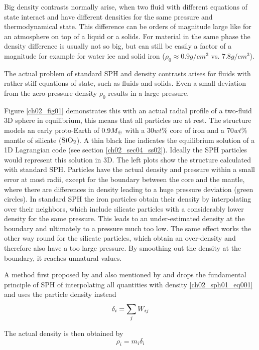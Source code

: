 Big density contrasts normally arise, when two fluid with different equations of state interact and have different densities for the same pressure and thermodynamical state. This difference can be orders of magnitude large like for an atmosphere on top of a liquid or a solids. For material in the same phase the density difference is usually not so big, but can still be easily a factor of a magnitude for example for water ice and solid iron ($\rho_0 \approx 0.9 g/cm^3$ vs. $7.8 g/cm^3$).

The actual problem of standard SPH and density contrasts arises for fluids with rather stiff equations of state, such as fluids and solids. Even a small deviation from the zero-pressure density $\rho_0$  results in a large pressure. 

Figure \ref{ch02_fig01} demonstrates this with an actual radial profile of a two-fluid 3D sphere in equilibrium, this means that all particles are at rest. The structure models an early proto-Earth of $0.9 M_{\oplus}$ with a $30 wt\%$ core of iron and a $70 wt\%$ mantle of silicate ($\mathrm{SiO}_2$). A thin black line indicates the equilibrium solution of a 1D Lagrangian code (see section \ref{ch02_sec04_ss02}). Ideally the SPH particles would represent this solution in 3D. The left plots show the structure calculated with standard SPH. Particles have the actual density and pressure within a small error at most radii, except for the boundary between the core and the mantle, where there are differences in density leading to a huge pressure deviation (green circles). In standard SPH the iron particles obtain their density by interpolating over their neighbors, which include silicate particles with a considerably lower density for the same pressure. This leads to an under-estimated density at the boundary and ultimately to a pressure much too low. The same effect works the other way round for the silicate particles, which obtain an over-density and therefore also have a too large pressure.  By smoothing out the density at the boundary, it reaches unnatural values. 

A method first proposed by \cite{Ott:2003p3727} and also mentioned by \cite{Solenthaler:2008p3720} and \cite{Price:2004p2613} drops the fundamental principle of SPH of interpolating all quantities with density \ref{ch02_sph01_eq001} and uses the particle density instead 
\begin{equation}
\label{ch02_sph01_eq030}
\delta_i = \sum_{j} W_{ij}
\end{equation}

The actual density is then obtained by 
\begin{equation}
\label{ch02_sph01_eq031}
\rho_i = m_i \delta_i
\end{equation}

